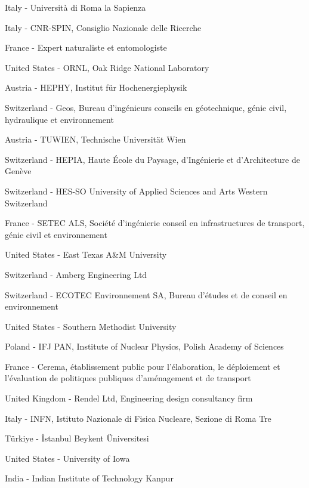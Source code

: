 \item[$^{98}$] Italy - Universit{\`a} di Roma la Sapienza
\item[$^{99}$] Italy - CNR-SPIN, Consiglio Nazionale delle Ricerche
\item[$^{100}$] France - Expert naturaliste et entomologiste
\item[$^{101}$] United States - ORNL, Oak Ridge National Laboratory
\item[$^{102}$] Austria - HEPHY, Institut f{\"u}r Hochenergiephysik
\item[$^{103}$] Switzerland - Geos, Bureau d'ing{\'e}nieurs conseils en g{\'e}otechnique, g{\'e}nie civil, hydraulique et environnement
\item[$^{104}$] Austria - TUWIEN, Technische Universit{\"a}t Wien
\item[$^{105}$] Switzerland - HEPIA, Haute {\'E}cole du Paysage, d'Ing{\'e}nierie et d'Architecture de Gen{\`e}ve
\item[$^{106}$] Switzerland - HES-SO University of Applied Sciences and Arts Western Switzerland
\item[$^{107}$] France - SETEC ALS, Soci{\'e}t{\'e} d'ing{\'e}nierie conseil en infrastructures de transport, g{\'e}nie civil et environnement
\item[$^{108}$] United States - East Texas A\&M University
\item[$^{109}$] Switzerland - Amberg Engineering Ltd
\item[$^{110}$] Switzerland - ECOTEC Environnement SA, Bureau d'{\'e}tudes et de conseil en environnement
\item[$^{111}$] United States - Southern Methodist University
\item[$^{112}$] Poland - IFJ PAN, Institute of Nuclear Physics, Polish Academy of Sciences
\item[$^{113}$] France - Cerema, {\'e}tablissement public pour l'{\'e}laboration, le d{\'e}ploiement et l'{\'e}valuation de politiques publiques d'am{\'e}nagement et de transport
\item[$^{114}$] United Kingdom - Rendel Ltd, Engineering design consultancy firm
\item[$^{115}$] Italy - INFN, Istituto Nazionale di Fisica Nucleare, Sezione di Roma Tre
\item[$^{116}$] T{\"u}rkiye - {\.{I}}stanbul Beykent {\"U}niversitesi
\item[$^{117}$] United States - University of Iowa
\item[$^{118}$] India - Indian Institute of Technology Kanpur
